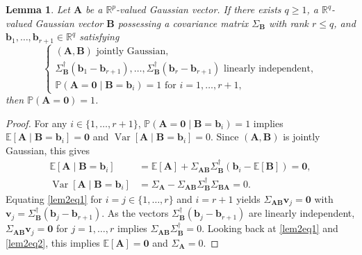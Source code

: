 \documentclass[11pt,a4paper]{article}
\newcommand{\R}{\mathbb{R}}
\newtheorem{lem}[thm]{Lemma}
\begin{document}
\begin{lem}\label{lem2}
Let $\boldsymbol{A}$ be a $\R^p$-valued Gaussian vector. If there exists $q\geq 1$, a $\R^q$-valued Gaussian vector $\boldsymbol{B}$ possessing a covariance matrix $\Sigma_{\boldsymbol{B}}$ with rank $r\leq q$, and $\boldsymbol{b}_1,\dots,\boldsymbol{b}_{r+1}\in \R^q$ satisfying
$$
\left\{
\begin{array}{l}
(\boldsymbol{A},\boldsymbol{B}) \text{ jointly Gaussian}, \\
\Sigma_{\boldsymbol{B}}^{\dag}(\boldsymbol{b}_1-\boldsymbol{b}_{r+1}),\dots,\Sigma_{\boldsymbol{B}}^{\dag}(\boldsymbol{b}_{r}-\boldsymbol{b}_{r+1}) \text{ linearly independent}, \\
\mathbb{P}(\boldsymbol{A}=\bm 0\mid \boldsymbol{B}=\boldsymbol{b}_i)=1 \text{ for } i=1,\dots,r+1,
\end{array}
\right.
$$
then $\mathbb{P}(\boldsymbol{A}=\bm 0)=1$.
\end{lem}
\begin{proof}
For any $i\in\{1,\dots,r+1\}$, $\mathbb{P}(\boldsymbol{A}=\bm 0\mid \boldsymbol{B}=\boldsymbol{b}_i)=1$ implies $\mathbb{E}[\boldsymbol{A}\mid \boldsymbol{B}=\boldsymbol{b}_i]=\bm 0$ and $\operatorname{Var}[\boldsymbol{A}\mid \boldsymbol{B}=\boldsymbol{b}_i]=0$. Since $(\boldsymbol{A},\boldsymbol{B})$ is jointly Gaussian, this gives
\begin{align}
\mathbb{E}[\boldsymbol{A}\mid \boldsymbol{B}=\boldsymbol{b}_i]&=\mathbb{E}[\boldsymbol{A}]+\Sigma_{\boldsymbol{A}\boldsymbol{B}}\Sigma_{\boldsymbol{B}}^{\dag}(\boldsymbol{b}_i-\mathbb{E}[\boldsymbol{B}])=\bm 0,\label{lem2eq1}\\
\operatorname{Var}[\boldsymbol{A}\mid \boldsymbol{B}=\boldsymbol{b}_i]&=\Sigma_{\boldsymbol{A}}-\Sigma_{\boldsymbol{A}\boldsymbol{B}}\Sigma_{\boldsymbol{B}}^{\dag}\Sigma_{\boldsymbol{B}\boldsymbol{A}}=0.\label{lem2eq2}
\end{align}
Equating \eqref{lem2eq1} for $i=j\in\{1,\dots,r\}$ and $i=r+1$ yields $\Sigma_{\boldsymbol{A}\boldsymbol{B}}\boldsymbol{v}_j=\bm 0$ with $\boldsymbol{v}_j=\Sigma_{\boldsymbol{B}}^{\dag}(\boldsymbol{b}_j-\boldsymbol{b}_{r+1})$. As the vectors $\Sigma_{\boldsymbol{B}}^{\dag}(\boldsymbol{b}_j-\boldsymbol{b}_{r+1})$ are linearly independent, $\Sigma_{\boldsymbol{A}\boldsymbol{B}}\boldsymbol{v}_j=\bm 0$ for $j=1,\dots,r$ implies $\Sigma_{\boldsymbol{A}\boldsymbol{B}}\Sigma_{\boldsymbol{B}}^{\dag}=0$. Looking back at \eqref{lem2eq1} and \eqref{lem2eq2}, this implies $\mathbb{E}[\boldsymbol{A}]=\bm 0$ and $\Sigma_{\boldsymbol{A}}=0$.
\end{proof}
\end{document}
